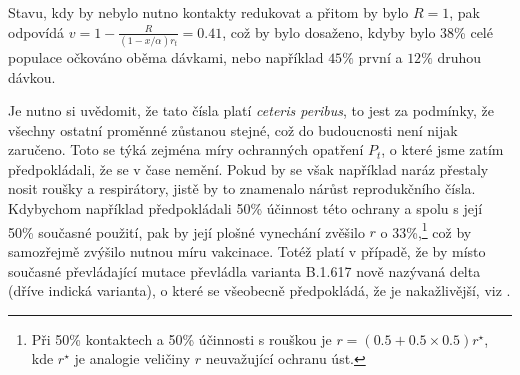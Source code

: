 Stavu, kdy by nebylo nutno kontakty redukovat a přitom by bylo $R=1$,
pak odpovídá $v=1-\frac{R}{(1-x/\alpha)r_{t}}=0.41$, což by bylo dosaženo, kdyby bylo 38\% celé populace očkováno oběma dávkami, nebo
například $45\%$ první a $12\%$ druhou dávkou.

Je nutno si uvědomit, že tato čísla platí \emph{ceteris peribus},
to jest za podmínky, že všechny ostatní proměnné zůstanou stejné, což do budoucnosti není nijak zaručeno.
Toto se týká zejména míry ochranných opatření $P_{t}$, o které jsme zatím
předpokládali, že se v čase nemění. Pokud by se však například
naráz přestaly nosit roušky a respirátory, jistě by to znamenalo nárůst
reprodukčního čísla. Kdybychom například předpokládali 50\%
účinnost této ochrany a spolu s \cite{paqcovid} její 50\% současné
použití, pak by její plošné vynechání zvěšilo $r$ o 33\%,\footnote{Při 50\% kontaktech a 50\% účinnosti s rouškou je $r=(0.5+0.5\times0.5)r^{\star}$,
kde $r^{\star}$ je analogie veličiny $r$ neuvažující ochranu úst.} což by samozřejmě zvýšilo nutnou míru vakcinace. Totéž platí v případě,
že by místo současné převládající mutace převládla 
varianta B.1.617 nově nazývaná delta (dříve indická varianta), o které se všeobecně předpokládá, že je nakažlivější,
viz \cite{ecdc2021india}. 

